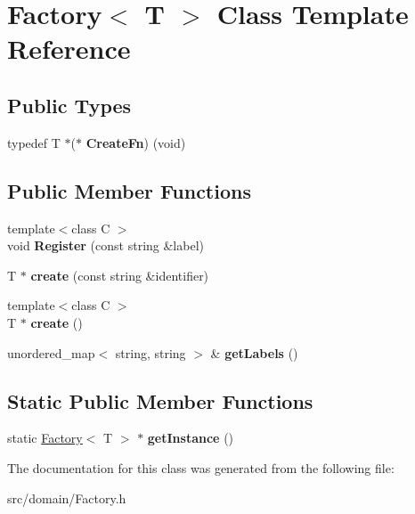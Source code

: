 \hypertarget{class_factory}{}\section{Factory$<$ T $>$ Class Template Reference}
\label{class_factory}
\subsection*{Public Types}
\begin{DoxyCompactItemize}
\item 
\hypertarget{class_factory_ac84d352680c5cda7b6b15025f4fa0b8b}{}typedef T $\ast$($\ast$ {\bfseries Create\+Fn}) (void)\label{class_factory_ac84d352680c5cda7b6b15025f4fa0b8b}

\end{DoxyCompactItemize}
\subsection*{Public Member Functions}
\begin{DoxyCompactItemize}
\item 
\hypertarget{class_factory_a032a0ba3eeb8e43201c2a34ebacfbd57}{}{\footnotesize template$<$class C $>$ }\\void {\bfseries Register} (const string \&label)\label{class_factory_a032a0ba3eeb8e43201c2a34ebacfbd57}

\item 
\hypertarget{class_factory_a7fad946e94c6f33cf1f801d4bcdb3ce8}{}T $\ast$ {\bfseries create} (const string \&identifier)\label{class_factory_a7fad946e94c6f33cf1f801d4bcdb3ce8}

\item 
\hypertarget{class_factory_aa3b6b6cf2034462ad4a08564173f2574}{}{\footnotesize template$<$class C $>$ }\\T $\ast$ {\bfseries create} ()\label{class_factory_aa3b6b6cf2034462ad4a08564173f2574}

\item 
\hypertarget{class_factory_a0ec1bcb787080ddf713f19b61b47e6a0}{}unordered\+\_\+map$<$ string, string $>$ \& {\bfseries get\+Labels} ()\label{class_factory_a0ec1bcb787080ddf713f19b61b47e6a0}

\end{DoxyCompactItemize}
\subsection*{Static Public Member Functions}
\begin{DoxyCompactItemize}
\item 
\hypertarget{class_factory_a8a05f8e1a60d57e297509a7a483cb46a}{}static \hyperlink{class_factory}{Factory}$<$ T $>$ $\ast$ {\bfseries get\+Instance} ()\label{class_factory_a8a05f8e1a60d57e297509a7a483cb46a}

\end{DoxyCompactItemize}


The documentation for this class was generated from the following file\+:\begin{DoxyCompactItemize}
\item 
src/domain/Factory.\+h\end{DoxyCompactItemize}

